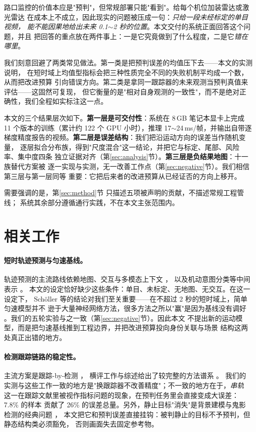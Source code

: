 \documentclass[11pt,a4paper]{ctexart}
\begin{document}
路口监控的价值本应是"预判"，但常规部署只能"看到"。给每个机位加装雷达或激光雷达
在成本上不成立，因此现实的问题被压成一句：\emph{只给一段未经标定的单目视频，
能不能因果地给出未来 0.1$\sim$2 秒的位置}。本文交付的系统正面回答这个问题，并且
把回答的重点放在两件事上：一是它究竟做到了什么程度，二是它\emph{错在哪里}。

我们刻意回避了两类常见做法。第一类是把预判误差的均值压下去——本文的实测说明，
在短时域上均值型指标会把三种性质完全不同的失败机制平均成一个数，从而把改进预算
引向错误方向。第二类是拿同一跟踪器的未来观测当预判真值来评估——这固然可复现，
但它衡量的是"相对自身观测的一致性"，而不是绝对正确性，我们全程如实标注这一点。

本文的三个结果层次如下。\textbf{第一层是可交付性}：系统在 8\,GB 笔记本显卡上完成
11 个版本的训练（累计约 122 个 GPU 小时），推理 17$\sim$24\,ms/帧，并输出自带逐
梯度精度报告的视频。\textbf{第二层是误差结构}：我们把沿运动方向的误差当作随机变量，
逐层拟合分布族，得到"尺度混合"这一结论，并把它与标定、尾部、风险率、集中度四条
独立证据对齐（第\ref{sec:analysis}节）。\textbf{第三层是负结果地图}：十一族替代方案被
逐一实现与实测，无一改善工作点（第\ref{sec:negative}节）。我们相信第三层与第一层同等
重要：它把后来者的改进预算从已经证否的方向上移开。

需要强调的是，第\ref{sec:method}节 只描述五项被声明的贡献，不描述常规工程管线；
系统其余部分遵循通行实践，不在本文主张范围内。

\section{相关工作}
\label{sec:related}

\paragraph{短时轨迹预测与匀速基线。}
轨迹预测的主流路线依赖地图、交互与多模态上下文
\citep{liu2021vehicletraj,bharilya2023avtraj,finet2025human}，
以及机动意图分类等中间表示 \citep{deo2018maneuver,hasan2021maneuver,raskoti2025miat}。
本文的设定恰好缺少这些条件：单目、未标定、无地图、无交互。在这一设定下，
Sch\"oller 等的结论对我们至关重要——在不超过 2 秒的短时域上，简单匀速模型并不
逊于大量神经网络方法，很多方法之所以"赢"是因为基线没有调好
\citep{scholler2020cv}。我们的五轮实验与之一致（第\ref{sec:negative}节）。因此本文
不提出新的运动模型，而是把匀速基线推到工程边界，并把改进预算投向身份关联与场景
结构这两处真正出错的地方。

\paragraph{检测跟踪链路的稳定性。}
主流方案是跟踪-by-检测 \citep{bewick2016sort,wojke2017deepsort,zhang2022bytetrack}，
横评工作与综述给出了较完整的方法谱系 \citep{aharon2022botsort,cao2023ocsort,luo2021mot}。
我们的实测与这些工作一致的地方是"换跟踪器不改善精度"；不一致的地方在于，\emph{串轨}
这一在跟踪文献里被视作指标问题的现象，在预判任务里会直接变成大误差：7.8\% 的样本
贡献了 26\% 的误差总量。另外，静止目标"消失"是背景建模与鬼影检测的经典问题
\citep{bouwmans2014background,cucchiara2003ghosts,ghimire2025stationary}，
本文把它和预判误差直接挂钩：被判静止的目标不予预判，但静态结构类必须豁免，
否则画面失去固定参考物。
\end{document}
